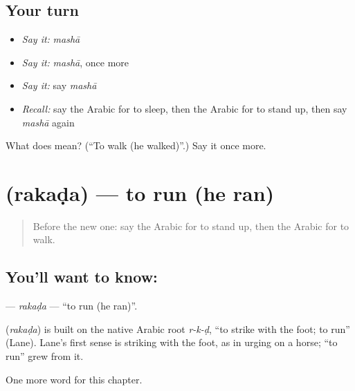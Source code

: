 \subsection*{Your turn}
\begin{itemize}
\raggedright
  \item \emph{Say it:} \emph{mashā}
  \item \emph{Say it:} \emph{mashā}, once more
  \item \emph{Say it:} say \emph{mashā}
  \item \emph{Recall:} say the Arabic for to sleep, then the Arabic for to stand up, then say \emph{mashā} again
\end{itemize}

\begin{tcolorbox}[breakable,colback=teal!4,colframe=teal!35!black,title={Before you move on}]
What does  mean? (\textquotedblleft{}To walk (he walked)\textquotedblright{}.) Say it once more.
\end{tcolorbox}
\section[\texorpdfstring{\ar{ركض} (rakaḍa)}{ركض (rakaḍa)}]{ (rakaḍa) — to run (he ran)}

\label{lesson:AR-C58-rakada}



\begin{quote}
Before the new one: say the Arabic for to stand up, then the Arabic for to walk.
\end{quote}

\subsection*{You'll want to know: }
\textbf{} — \emph{rakaḍa} — \textquotedblleft{}to run (he ran)\textquotedblright{}.

\begin{cousinweb}
\textbf{} (\emph{rakaḍa}) is built on the native Arabic root \emph{r-k-ḍ}, \textquotedblleft{}to strike with the foot; to run\textquotedblright{} (Lane). Lane's first sense is striking with the foot, as in urging on a horse; \textquotedblleft{}to run\textquotedblright{} grew from it.
\end{cousinweb}

\begin{grammarlens}[title={What you've built}]
One more word for this chapter.
\end{grammarlens}

